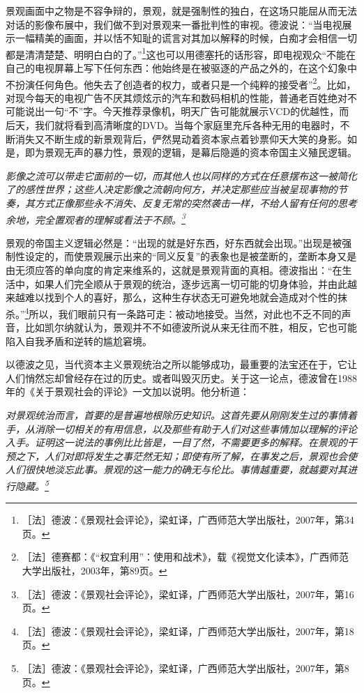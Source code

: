 \documentclass[fontset=fandol, a4paper, 12pt, openright]{ctexbook}
\renewenvironment{quote}
  {\list{}{\rightmargin\leftmargin}%
   \item\relax\small\itshape\color{darkgray}}
  {\endlist}
\begin{document}
景观画面中之物是不容争辩的，景观，就是强制性的独白，在这场只能屈从而无法对话的影像布展中，我们做不到对景观来一番批判性的审视。德波说：“当电视展示一幅精美的画面，并以恬不知耻的谎言对其加以解释的时候，白痴才会相信一切都是清清楚楚、明明白白的了。”\footnote{［法］德波：《景观社会评论》，梁虹译，广西师范大学出版社，2007年，第34页。}这也可以用德塞托的话形容，即电视观众“不能在自己的电视屏幕上写下任何东西：他始终是在被驱逐的产品之外的，在这个幻象中不扮演任何角色。他失去了创造者的权力，或者只是一个纯粹的接受者”\footnote{［法］德赛都：《“权宜利用”：使用和战术》，载《视觉文化读本》，广西师范大学出版社，2003年，第89页。}。{\kaishu 比如，对现今每天的电视广告不厌其烦炫示的汽车和数码相机的性能，普通老百姓绝对不可能说出一句“不”字。今天推荐录像机，明天广告可能就展示VCD的优越性，而后天，我们就将看到高清晰度的DVD。当每个家庭里充斥各种无用的电器时，不断消失又不断生成的新景观背后，俨然晃动着资本家点着钞票仰天大笑的身影。}如是，即为景观无声的暴力性，景观的逻辑，是幕后隐遁的资本帝国主义殖民逻辑。

\begin{quote}
影像之流可以带走它面前的一切，而其他人也以同样的方式在任意摆布这一被简化了的感性世界；这些人决定影像之流朝向何方，并决定那些应当被呈现事物的节奏，其方式正像那些永不消失、反复无常的突然袭击一样，不给人留有任何的思考余地，完全置观者的理解或看法于不顾。\footnote{［法］德波：《景观社会评论》，梁虹译，广西师范大学出版社，2007年，第16页。}
\end{quote}

景观的帝国主义逻辑必然是：“出现的就是好东西，好东西就会出现。”出现是被强制性设定的，而使景观展示出来的“同义反复”的表象也是被垄断的，垄断本身又是由无须应答的单向度的肯定来维系的，这就是景观背面的真相。德波指出：“在生活中，如果人们完全顺从于景观的统治，逐步远离一切可能的切身体验，并由此越来越难以找到个人的喜好，那么，这种生存状态无可避免地就会造成对个性的抹杀。”\footnote{［法］德波：《景观社会评论》，梁虹译，广西师范大学出版社，2007年，第18页。}所以，我们眼前只有一条路可走：被动地接受。{\kaishu 当然，对此也不乏不同的声音，比如凯尔纳就认为，景观并不不如德波所说从来无往而不胜，相反，它也可能陷入自我矛盾和逆转的尴尬窘境。}

以德波之见，当代资本主义景观统治之所以能够成功，最重要的法宝还在于，它让人们悄然忘却曾经存在过的历史。或者叫毁灭历史。关于这一论点，德波曾在1988年的《关于景观社会的评论》一文加以说明。他分析道：

\begin{quote}
对景观统治而言，首要的是普遍地根除历史知识。这首先要从刚刚发生过的事情着手，从消除一切相关的有用信息，以及那些有助于人们对这些事情加以理解的评论入手。证明这一说法的事例比比皆是，一目了然，不需要更多的解释。在景观的干预之下，人们对即将发生之事茫然无知；即使有所了解，在事发之后，景观也会使人们很快地淡忘此事。景观的这一能力的确无与伦比。事情越重要，就越要对其进行隐藏。\footnote{［法］德波：《景观社会评论》，梁虹译，广西师范大学出版社，2007年，第8页。}
\end{quote}
\end{document}
